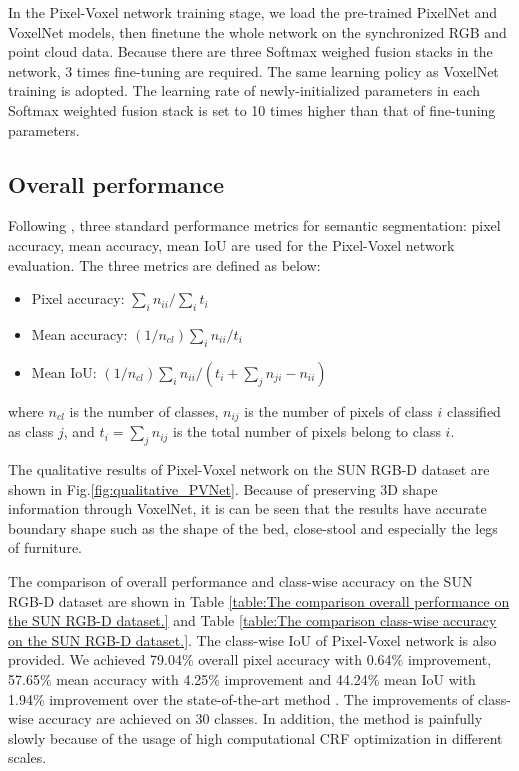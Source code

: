 \documentclass[letterpaper, 10 pt, conference]{ieeeconf}
\begin{document}
In the Pixel-Voxel network training stage, we load the pre-trained PixelNet and VoxelNet models, then finetune the whole network on the synchronized RGB and point cloud data. Because there are three Softmax weighed fusion stacks in the network, 3 times fine-tuning are required. The same learning policy as VoxelNet training is adopted. The learning rate of newly-initialized parameters in each Softmax weighted fusion stack is set to 10 times higher than that of fine-tuning parameters.

\subsection{Overall performance}\label{sec:4.3}
Following \cite{long2015fully}, three standard performance metrics for semantic segmentation: pixel accuracy, mean accuracy, mean IoU are used for the Pixel-Voxel network evaluation. The three metrics are defined as below:
\begin{itemize}
\item Pixel accuracy: $\sum_{i} n_{ii} / \sum_{i} t_{i}$

\item Mean accuracy: $(1/n_{cl})\sum_{i} n_{ii} / t_{i}$
 
\item Mean IoU: $ (1/n_{cl})\sum_{i} n_{ii}/(t_{i} + \sum_{j} n_{ji} - n_{ii}) $
\end{itemize}
where $n_{cl}$ is the number of classes, $n_{ij}$ is the number of pixels of class $i$ classified as class $j$, and $ t_{i} = \sum_{j} n_{ij} $ is the total number of pixels belong to class $i$.

The qualitative results of Pixel-Voxel network on the SUN RGB-D dataset are shown in Fig.\ref{fig:qualitative_PVNet}. Because of preserving 3D shape information through VoxelNet, it is can be seen that the results have accurate boundary shape such as the shape of the bed, close-stool and especially the legs of furniture. 

The comparison of overall performance and class-wise accuracy on the SUN RGB-D dataset are shown in Table \ref{table:The comparison overall performance on the SUN RGB-D dataset.} and Table \ref{table:The comparison class-wise accuracy on the SUN RGB-D dataset.}. The class-wise IoU of Pixel-Voxel network is also provided. We achieved 79.04\% overall pixel accuracy with 0.64\% improvement, 57.65\% mean accuracy with 4.25\% improvement and 44.24\% mean IoU with 1.94\% improvement over the state-of-the-art method \cite{lin2017exploring}. The improvements of class-wise accuracy are achieved on 30 classes. In addition, the method \cite{lin2017exploring} is painfully slowly because of the usage of high computational CRF optimization in different scales. 
\end{document}
